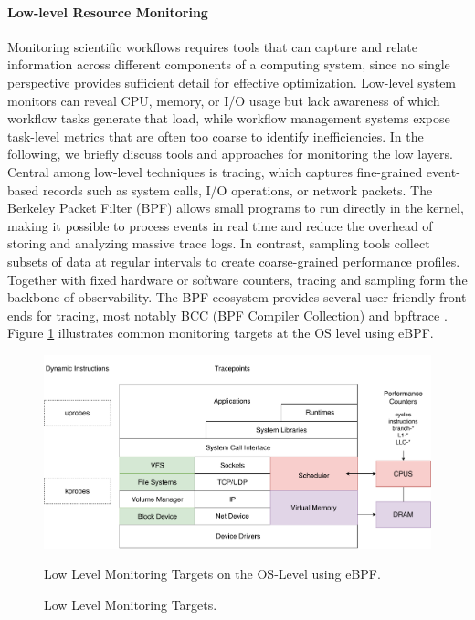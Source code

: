 \paragraph{Low-level Resource Monitoring}
Monitoring scientific workflows requires tools that can capture and relate information across different components of a computing system, since no single perspective provides sufficient detail for effective optimization. Low-level system monitors can reveal CPU, memory, or I/O usage but lack awareness of which workflow tasks generate that load, while workflow management systems expose task-level metrics that are often too coarse to identify inefficiencies. In the following, we briefly discuss tools and approaches for monitoring the low layers.
Central among low-level techniques is tracing, which captures fine-grained event-based records such as system calls, I/O operations, or network packets. The Berkeley Packet Filter (BPF) allows small programs to run directly in the kernel, making it possible to process events in real time and reduce the overhead of storing and analyzing massive trace logs. In contrast, sampling tools collect subsets of data at regular intervals to create coarse-grained performance profiles. Together with fixed hardware or software counters, tracing and sampling form the backbone of observability.
The BPF ecosystem provides several user-friendly front ends for tracing, most notably BCC (BPF Compiler Collection) and bpftrace \cite{gregg2020bpf}. Figure \ref{fig:02-ebpf-os} illustrates common monitoring targets at the OS level using eBPF.
\begin{figure}[H]
    \centering
    \includegraphics[scale=0.4]{fig/02/02-ebpf-os.pdf}
    \caption{Low Level Monitoring Targets.}
    \label{fig:02-ebpf-os}
    \tiny
    Low Level Monitoring Targets on the OS-Level using eBPF.
\end{figure}

